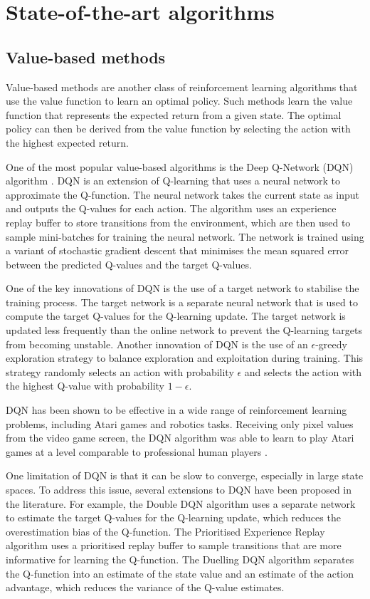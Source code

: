 \section{State-of-the-art algorithms}
\label{sec:rl_algs}

\subsection{Value-based methods}
Value-based methods are another class of reinforcement learning algorithms that use the value function to learn an optimal policy.
Such methods learn the value function that represents the expected return from a given state.
The optimal policy can then be derived from the value function by selecting the action with the highest expected return.

One of the most popular value-based algorithms is the Deep Q-Network (DQN) algorithm \autocite{mnih2013}.
DQN is an extension of Q-learning that uses a neural network to approximate the Q-function.
The neural network takes the current state as input and outputs the Q-values for each action.
The algorithm uses an experience replay buffer to store transitions from the environment, which are then used to sample mini-batches for training the neural network.
The network is trained using a variant of stochastic gradient descent that minimises the mean squared error between the predicted Q-values and the target Q-values.

One of the key innovations of DQN is the use of a target network to stabilise the training process.
The target network is a separate neural network that is used to compute the target Q-values for the Q-learning update.
The target network is updated less frequently than the online network to prevent the Q-learning targets from becoming unstable.
Another innovation of DQN is the use of an $\epsilon$-greedy exploration strategy to balance exploration and exploitation during training.
This strategy randomly selects an action with probability $\epsilon$ and selects the action with the highest Q-value with probability $1-\epsilon$.

DQN has been shown to be effective in a wide range of reinforcement learning problems, including Atari games and robotics tasks.
Receiving only pixel values from the video game screen, the DQN algorithm was able to learn to play Atari games at a level comparable to professional human players \autocite{mnih2015}.

One limitation of DQN is that it can be slow to converge, especially in large state spaces.
To address this issue, several extensions to DQN have been proposed in the literature.
For example, the Double DQN algorithm \autocite{hasselt2016} uses a separate network to estimate the target Q-values for the Q-learning update, which reduces the overestimation bias of the Q-function.
The Prioritised Experience Replay algorithm \autocite{schaul2015} uses a prioritised replay buffer to sample transitions that are more informative for learning the Q-function.
The Duelling DQN algorithm \autocite{wang2016} separates the Q-function into an estimate of the state value and an estimate of the action advantage, which reduces the variance of the Q-value estimates.

